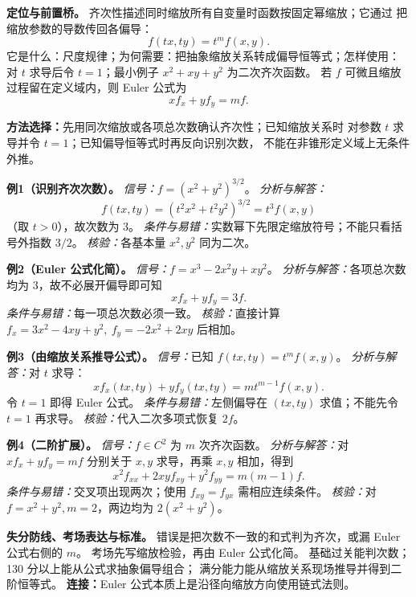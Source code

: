 
\begin{knowledgeBox}
\textbf{定位与前置桥。}
齐次性描述同时缩放所有自变量时函数按固定幂缩放；它通过
把缩放参数的导数传回各偏导：
\[
f(tx,ty)=t^m f(x,y).
\]
它是什么：尺度规律；为何需要：把抽象缩放关系转成偏导恒等式；怎样使用：
对 \(t\) 求导后令 \(t=1\)；最小例子 \(x^2+xy+y^2\) 为二次齐次函数。
若 \(f\) 可微且缩放过程留在定义域内，则 Euler 公式为
\[
xf_x+yf_y=mf.
\]

\textbf{方法选择：}先用同次缩放或各项总次数确认齐次性；已知缩放关系时
对参数 \(t\) 求导并令 \(t=1\)；已知偏导恒等式时再反向识别次数，
不能在非锥形定义域上无条件外推。

\textbf{例1（识别齐次次数）。}
\emph{信号：}\(f=(x^2+y^2)^{3/2}\)。
\emph{分析与解答：}
\[
f(tx,ty)=(t^2x^2+t^2y^2)^{3/2}=t^3f(x,y)
\]
（取 \(t>0\)），故次数为 \(3\)。
\emph{条件与易错：}实数幂下先限定缩放符号；不能只看括号外指数 \(3/2\)。
\emph{核验：}各基本量 \(x^2,y^2\) 同为二次。

\textbf{例2（Euler 公式化简）。}
\emph{信号：}\(f=x^3-2x^2y+xy^2\)。
\emph{分析与解答：}各项总次数均为 \(3\)，故不必展开偏导即可知
\[
xf_x+yf_y=3f.
\]
\emph{条件与易错：}每一项总次数必须一致。
\emph{核验：}直接计算
\(f_x=3x^2-4xy+y^2,\ f_y=-2x^2+2xy\) 后相加。

\textbf{例3（由缩放关系推导公式）。}
\emph{信号：}已知 \(f(tx,ty)=t^m f(x,y)\)。
\emph{分析与解答：}对 \(t\) 求导：
\[
xf_x(tx,ty)+yf_y(tx,ty)=mt^{m-1}f(x,y).
\]
令 \(t=1\) 即得 Euler 公式。
\emph{条件与易错：}左侧偏导在 \((tx,ty)\) 求值；不能先令 \(t=1\) 再求导。
\emph{核验：}代入二次多项式恢复 \(2f\)。

\textbf{例4（二阶扩展）。}
\emph{信号：}\(f\in C^2\) 为 \(m\) 次齐次函数。
\emph{分析与解答：}对 \(xf_x+yf_y=mf\) 分别关于 \(x,y\) 求导，再乘
\(x,y\) 相加，得到
\[
x^2f_{xx}+2xyf_{xy}+y^2f_{yy}=m(m-1)f.
\]
\emph{条件与易错：}交叉项出现两次；使用 \(f_{xy}=f_{yx}\) 需相应连续条件。
\emph{核验：}对 \(f=x^2+y^2,m=2\)，两边均为 \(2(x^2+y^2)\)。

\textbf{失分防线、考场表达与标准。}
错误是把次数不一致的和式判为齐次，或漏 Euler 公式右侧的 \(m\)。
考场先写缩放检验，再由 Euler 公式化简。
基础过关能判次数；130 分以上能从公式求抽象偏导组合；
满分能力能从缩放关系现场推导并得到二阶恒等式。
\textbf{连接：}Euler 公式本质上是沿径向缩放方向使用链式法则。
\end{knowledgeBox}

